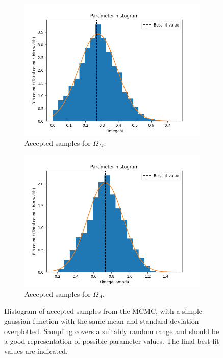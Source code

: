 \begin{appendix}
\begin{figure}[h!tb]
\begin{subfigure}[t!]{0.4\textwidth}
    \label{fig:milestone_1_OmegaK_histogram}
    \end{subfigure}
    \hfill
    \begin{subfigure}[b!]{0.4\textwidth}
    \centering
    \includegraphics[width=1.0\textwidth]{../Milestone 1/Plots/OmegaM_histogram.png}
    \caption{Accepted samples for $\Omega_M$.}
    \label{fig:milestone_1_OmegaM_histogram}
    \end{subfigure}
    \begin{subfigure}[b!]{0.4\textwidth}
    \centering
    \includegraphics[width=1.0\textwidth]{../Milestone 1/Plots/OmegaLambda_histogram.png}
    \caption{Accepted samples for $\Omega_\Lambda$.}
    \label{fig:milestone_1_OmegaLambda_histogram}
    \end{subfigure}
\caption{Histogram of accepted samples from the MCMC, with a simple gaussian function with the same mean and standard deviation overplotted. Sampling covers a suitably random range and should be a good representation of possible parameter values. The final best-fit values are indicated.}
\label{fig:milestone_1_appendix_histograms}
\end{figure}


\end{appendix}
